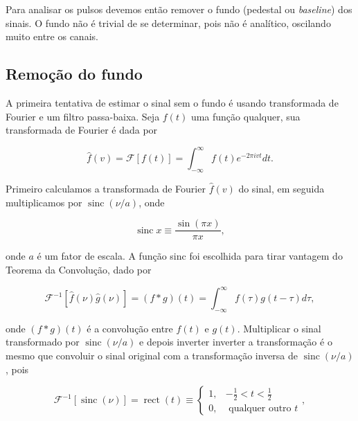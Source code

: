 \documentclass[a4paper,12pt,oneside]{book}
\DeclareMathOperator{\sinc}{sinc}
\DeclareMathOperator{\rect}{rect}
\begin{document}
\par Para analisar os pulsos devemos então remover o fundo (pedestal ou \textit{baseline}) dos sinais. O fundo não é trivial de se determinar, pois não é analítico, oscilando muito entre os canais.

\subsection{Remoção do fundo}

A primeira tentativa de estimar o sinal sem o fundo é usando transformada de Fourier e um filtro passa-baixa. Seja $f(t)$ uma função qualquer, sua transformada de Fourier é dada por

\begin{equation} \label{eq:fourier}
    \hat{f}(v)=\mathscr{F}[f(t)]=\int_{-\infty}^{\infty} f(t) e^{-2 \pi i v t} d t.
\end{equation}

\par Primeiro calculamos a transformada de Fourier $\hat{f}(v)$ do sinal, em seguida multiplicamos por $\sinc(\nu / a)$, onde

\begin{equation}
    \sinc x \equiv \frac{\sin (\pi x)}{\pi x},
\end{equation}

\par onde $a$ é um fator de escala. A função sinc foi escolhida para tirar vantagem do Teorema da Convolução, dado por\cite{metodos_mat_aplicada}

\begin{equation}
    \mathscr{F}^{-1}[\hat{f}(\nu) \hat{g}(\nu)]=(f * g)(t)=\int_{-\infty}^{\infty} f(\tau) g(t-\tau) d \tau, 
\end{equation}

\par onde $(f * g)(t)$ é a convolução entre $f(t)$ e $g(t)$. Multiplicar o sinal transformado por $\sinc (\nu / a)$ e depois inverter inverter a transformação é o mesmo que convoluir o sinal original com a transformação inversa de $\sinc (\nu / a)$, pois

\begin{equation}
\mathscr{F}^{-1}[\sinc(\nu)]=\rect(t) \equiv \begin{cases}1, & -\frac{1}{2}<t<\frac{1}{2} \\ 0, & \text { qualquer outro }t\end{cases},
\end{equation}
\end{document}
